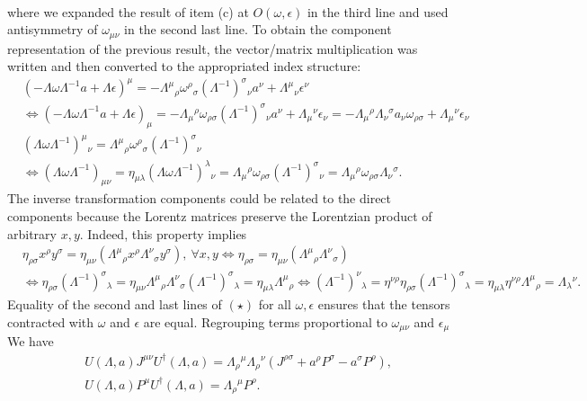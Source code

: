 \documentclass[10pt, a4paper]{article}
\begin{document}
\begin{enumerate}
\begin{align*}
  \end{align*}
  where we expanded the result of item (c) at $O(\omega, \epsilon)$ in the third line and used antisymmetry of $\omega_{\mu\nu}$ in the second last line. To obtain the component representation of the previous result, the vector/matrix multiplication was written and then converted to the appropriated index structure:
  \begin{align*}
    &(-\Lambda\omega \Lambda^{-1} a + \Lambda \epsilon)^\mu = -\Lambda^{\mu}{}_{\rho} \omega^{\rho}{}_{\sigma}  (\Lambda^{-1})^{\sigma}{}_{\nu} a^{\nu} + \Lambda^{\mu}{}_{\nu} \epsilon^{\nu}\\ &\iff (-\Lambda\omega \Lambda^{-1} a + \Lambda \epsilon)_\mu = -\Lambda_{\mu}{}^{\rho} \omega_{\rho\sigma}  (\Lambda^{-1})^{\sigma}{}_{\nu} a^{\nu} + \Lambda_{\mu}{}^{\nu} \epsilon_{\nu} =  -\Lambda_{\mu}{}^{\rho} \Lambda_{\nu}{}^{\sigma} a_{\nu} \omega_{\rho\sigma} + \Lambda_{\mu}{}^{\nu} \epsilon_{\nu}\\
    &(\Lambda \omega \Lambda^{-1})^{\mu}{}_{\nu} = \Lambda^{\mu}{}_{\rho}  \omega^{\rho}{}_{\sigma}  (\Lambda^{-1})^{\sigma}{}_{\nu}\\
    &\iff (\Lambda \omega \Lambda^{-1})_{\mu\nu} = \eta_{\mu\lambda} (\Lambda \omega \Lambda^{-1})^{\lambda}{}_{\nu} = \Lambda_{\mu}{}^{\rho}  \omega_{\rho\sigma}  (\Lambda^{-1})^{\sigma}{}_{\nu} = \Lambda_{\mu}{}^{\rho}  \omega_{\rho\sigma} \Lambda_{\nu}{}^{\sigma}.
  \end{align*}
  The inverse transformation components could be related to the direct components because the Lorentz matrices preserve the Lorentzian product of arbitrary $x, y$. Indeed, this property implies 
  \begin{align*}
    &\eta_{\rho \sigma} x^{\rho} y^{\sigma}= \eta_{\mu \nu}(\Lambda^{\mu}{}_{\rho} x^\rho  \Lambda^{\nu}{}_{\sigma} y^{\sigma}), \ \forall x, y \iff \eta_{\rho \sigma}= \eta_{\mu \nu}(\Lambda^{\mu}{}_{\rho} \Lambda^{\nu}{}_{\sigma}) \\
    &\iff \eta_{\rho \sigma} (\Lambda^{-1})^{\sigma}{}_{\lambda}= \eta_{\mu \nu} \Lambda^{\mu}{}_{\rho} \Lambda^{\nu}{}_{\sigma} (\Lambda^{-1})^{\sigma}{}_{\lambda} = \eta_{\mu \lambda} \Lambda^{\mu}{}_{\rho}
    \iff (\Lambda^{-1})^{\nu}{}_{\lambda} = \eta^{\nu \rho}\eta_{\rho \sigma} (\Lambda^{-1})^{\sigma}{}_{\lambda}= \eta_{\mu \lambda} \eta^{\nu \rho} \Lambda^{\mu}{}_{\rho} = \Lambda_{\lambda}{}^{\nu}.
  \end{align*}
  Equality of the second and last lines of $(\star)$ for all $\omega, \epsilon$ ensures that the tensors contracted with $\omega$ and $\epsilon$ are equal. Regrouping terms proportional to $\omega_{\mu\nu}$ and $\epsilon_\mu$ We have 
  \begin{align*}
   &U(\Lambda, a) J^{\mu\nu} U^{\dagger}(\Lambda, a) =\Lambda_\rho{ }^\mu \Lambda_\rho{ }^\nu\left(J^{\rho \sigma}+a^\rho P^\sigma-a^\sigma P^\rho\right), \\ &U(\Lambda, a) P^\mu U^{\dagger}(\Lambda, a) =\Lambda_\rho{ }^\mu P^\rho .
  \end{align*}


\end{enumerate}
\end{document}
